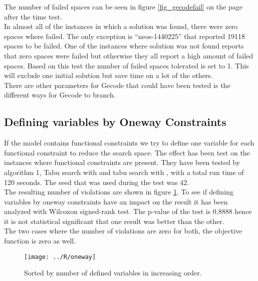 The number of failed spaces can be seen in figure \ref{fig_gecodefail} on the page after the time test. \\ 
In almost all of the instances in which a solution was found, there were zero spaces where failed. The only exception 
is ``neos-1440225'' that reported 19118 spaces to be failed. One of the instances where solution was not found reports 
that zero spaces were failed but otherwise they all report a high amount of failed spaces. Based on this test the 
number of failed spaces tolerated is set to 1. This will exclude one initial solution but save time on a lot of the 
others. \\ 
There are other parameters for Gecode that could have been tested is the different ways for Gecode to branch. \\ 
\phantom{p. 1}
\clearpage
\subsection{Defining variables by Oneway Constraints}
If the model contains functional constraints we try to define one variable for each functional constraint to reduce 
the search space. The effect has been test on the instances where functional constraints are present. They have been 
tested by algorithm 1, Tabu search with  and tabu search with , with a 
total run time of 120 seconds. The seed that was used during the test was $42$. \\ 
The resulting number of violations are shown in figure \ref{fig_onewaytest}. To see if defining variables 
by oneway constraints have an impact on the result it has been analyzed with Wilcoxon signed-rank test. The p-value of 
the test is 0.8888 hence it is not statistical significant that one result was better than the other. \\ 
The two cases where the number of violations are zero for both, the objective function is zero as well. 
\begin{figure}[!h]
\centering
\texttt{[image: ../R/oneway]} \caption{Sorted by number of defined variables in 
increasing order.}\label{fig_onewaytest}
\end{figure}\noindent
\
